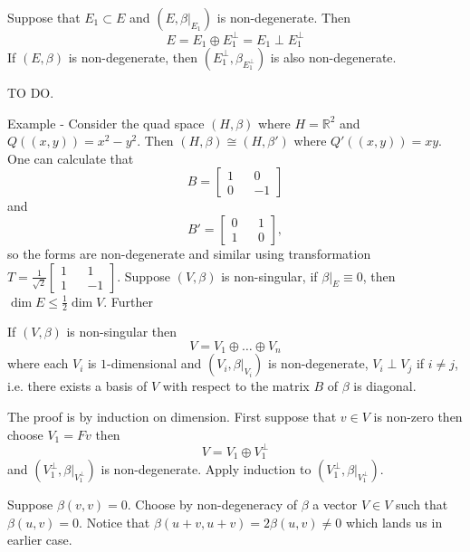 \documentclass[11pt,a4paper]{scrarticle}
\theoremstyle{definition}
\renewenvironment{proof}[1][\proofname]{\vspace{-10pt}\begin{myproof}}{\end{myproof}}
\theoremstyle{greenbox}
\newcommand{\R}{\mathbb{R}}
\begin{document}
\begin{lemma}
    Suppose that $ E_{1} \subset E $ and $ (E, \beta|_{E_{1}}) $ is non-degenerate. Then 
    \[ E = E_{1} \oplus E_{1}^{\perp} = E_{1} \perp E_{1}^{\perp} \]
    If $ (E, \beta) $ is non-degenerate, then $ (E_{1}^{\perp}, \beta_{E_{1}^{\perp}}) $ is also non-degenerate. 
\end{lemma}
\begin{proof}
    TO DO. 
\end{proof}

Example - Consider the quad space $ (H, \beta) $ where $ H = \R^{2} $ and $ Q((x,y)) = x^{2}-y^{2} $. Then $ (H, \beta) \cong (H, \beta') $ where $ Q'((x,y)) = xy $. One can calculate that 
\[ B = \begin{bmatrix}
    1 && 0 \\
    0 && -1
\end{bmatrix} \]
and 
\[ B ' = \begin{bmatrix}
    0 && 1 \\
    1 && 0
\end{bmatrix}, \]
so the forms are non-degenerate and similar using transformation $ T = \frac{1}{\sqrt{2}}\begin{bmatrix}
    1 && 1 \\
    1 && -1
\end{bmatrix} $. Suppose $ (V, \beta) $ is non-singular, if $ \beta|_{E} \equiv 0 $, then $ \dim E \le \frac{1}{2}\dim V $. Further \begin{lemma}
    If $ (V, \beta) $ is non-singular then 
\[ V = V_{1} \oplus \dots \oplus V_{n} \] 
where each $ V_{i} $ is $ 1 $-dimensional and $ (V_{i}, \beta|_{V_{i}}) $ is non-degenerate, $ V_{i} \perp V_{j} $ if $ i \neq j $, i.e. there exists a basis of $ V $ with respect to the matrix $ B $ of $ \beta $ is diagonal.
\end{lemma}
\begin{proof}
    The proof is by induction on dimension. First suppose that $ v \in V $ is non-zero then choose $ V_{1} = Fv $ then 
    \[ V = V_{1} \oplus V_{1}^{\perp} \]
    and $ (V_{1}^{\perp}, \beta|_{V_{1}^{\perp}}) $ is non-degenerate. Apply induction to $ (V_{1}^{\perp}, \beta|_{V_{1}^{\perp}}) $. 

    Suppose $ \beta(v,v) = 0 $. Choose by non-degeneracy of $ \beta $ a vector $ V \in V $ such that $ \beta(u,v) = 0 $. Notice that $ \beta(u+v,u+v) = 2\beta(u,v) \neq 0$ which lands us in earlier case.
\end{proof}
\end{document}
